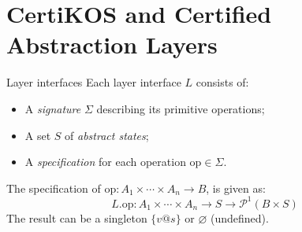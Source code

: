 \documentclass[aspectratio=54]{beamer}
\newcommand{\kw}[1]{\ensuremath{ \mathrm{#1} }}
\begin{document}
%
%
%


\section*{CertiKOS and Certified Abstraction Layers} %

\begin{frame}{Layer interfaces} %
  Each layer interface $L$ consists of:
  \begin{itemize}
    \item
      A \emph{signature} $\Sigma$ describing its primitive operations;
    \item
      A set $S$ of \emph{abstract states};
    \item
      A \emph{specification} for each operation $\kw{op} \in \Sigma$.
  \end{itemize}

  The specification of
  $\kw{op} : A_1 \times \cdots \times A_n \rightarrow B$,
  is given as:
  \[
    L.\kw{op} :
      A_1 \times \cdots \times A_n \rightarrow
      S \rightarrow \mathcal{P}^1(B \times S)
  \]
  The result can be a singleton $\{v@s\}$
  or $\varnothing$ (undefined).
\end{frame}
\end{document}
